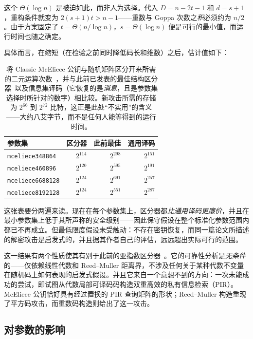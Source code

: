 这个 $\Theta(\log n)$ 是被迫如此，而非人为选择。代入 $D = n-2t-1$ 和 $d = s+1$，重构条件就变为 $2(s+1)t > n-1$——重数与 Goppa 次数之\emph{积}必须约为 $n/2$。由于方案固定了 $t = \Theta(n/\log n)$，$s = \Theta(\log n)$ 便是可行的最小值，而运行时间也随之确定。

具体而言，在缩短（在检验之前同时降低码长和维数）之后，估计值如下：

\begin{table}[H]
\centering
\begin{tabular}{lrrr}
\toprule
参数集 & 区分器 & 此前最佳 & 通用译码 \\
\midrule
\texttt{mceliece348864}  & $2^{114}$ & $2^{298}$ & $2^{151}$ \\
\texttt{mceliece460896}  & $2^{120}$ & $2^{595}$ & $2^{191}$ \\
\texttt{mceliece6688128} & $2^{124}$ & $2^{691}$ & $2^{257}$ \\
\texttt{mceliece8192128} & $2^{124}$ & $2^{551}$ & $2^{287}$ \\
\bottomrule
\end{tabular}
\caption{将 Classic McEliece 公钥与随机矩阵区分开来所需的二元运算次数~\cite{gijs2026}，并与此前已发表的最佳结构区分器~\cite{hw2025}以及信息集译码（它恢复的是\emph{消息}，且是参数集选择时所针对的数字）相比较。新攻击所需的存储为 $2^{66}$ 到 $2^{72}$ 比特，这正是此处“不实用”的含义——大约八艾字节，而不是任何人能等得到的运行时间。}
\label{tab:goppa-distinguishers}
\end{table}

这张表要分两遍来读。现在在每个参数集上，区分器都\emph{比通用译码更廉价}，并且在最小参数集上低于其所声称的安全级别——因此保守假设在整个标准化参数范围内都已不再成立。但最低限度假设未受触动：不存在密钥恢复，而同一篇论文所描述的解密攻击是启发式的，并且据其作者自己的评估，远远超出实际可行的范围。

这一结果有两个性质使其有别于此前的亚指数区分器~\cite{ran2025,hw2025}。它的可靠性分析是\emph{无条件}的——仅依赖线性代数和 Reed--Muller 距离界，不涉及任何关于某种代数不变量在随机码上如何表现的启发式假设。并且它来自一个意想不到的方向：一次未能成功的尝试，即试图从代数局部可译码码构造双重高效的私有信息检索（PIR）。McEliece 公钥恰好具有经过置换的 PIR 查询矩阵的形状；Reed--Muller 构造重现了平方码攻击，而重数码构造则给出了这一攻击。

\subsection{对参数的影响}

